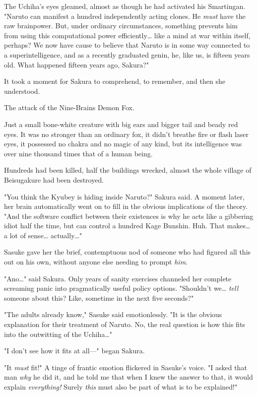 The Uchiha's eyes gleamed, almost as though he had activated his Smartingan.
"Naruto can manifest a hundred independently acting clones. He \emph{must} have
the raw brainpower. But, under ordinary circumstances, something prevents him
from using this computational power efficiently{\ldots} like a mind at war
within itself, perhaps? We now have cause to believe that Naruto is in some way
connected to a superintelligence, and as a recently graduated genin, he, like
us, is fifteen years old. What happened fifteen years ago, Sakura?"

It took a moment for Sakura to comprehend, to remember, and then she understood.

The attack of the Nine-Brains Demon Fox.

Just a small bone-white creature with big ears and bigger tail and beady red
eyes. It was no stronger than an ordinary fox, it didn't breathe fire or flash
laser eyes, it possessed no chakra and no magic of any kind, but its
intelligence was over nine thousand times that of a human being.

Hundreds had been killed, half the buildings wrecked, almost the whole village
of Beisugakure had been destroyed.

"You think the Kyubey is hiding inside Naruto?" Sakura said. A moment later,
her brain automatically went on to fill in the obvious implications of the
theory. "And the software conflict between their existences is why he acts like
a gibbering idiot half the time, but can control a hundred Kage Bunshin. Huh.
That makes{\ldots} a lot of sense{\ldots} actually{\ldots}"

Sasuke gave her the brief, contemptuous nod of someone who had figured all this
out on his own, without anyone else needing to prompt \emph{him}.

"Ano{\ldots}" said Sakura. Only years of sanity exercises channeled her
complete screaming panic into pragmatically useful policy options. "Shouldn't
we{\ldots} \emph{tell} someone about this? Like, sometime in the next five
seconds?"

"The adults already know," Sasuke said emotionlessly. "It is the obvious
explanation for their treatment of Naruto. No, the real question is how this
fits into the outwitting of the Uchiha{\ldots}"

"I don't see how it fits at all---" began Sakura.

"It \emph{must} fit!" A tinge of frantic emotion flickered in Sasuke's voice.
"I asked that man \emph{why} he did it, and he told me that when I knew the
answer to that, it would explain \emph{everything!} Surely \emph{this} must
also be part of what is to be explained!"

